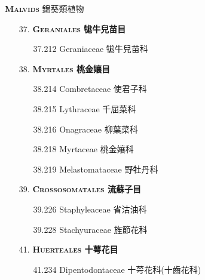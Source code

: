 \vspace{2ex} 
\noindent \normalsize\textsc{\textbf{Malvids} 錦葵類植物}\selectfont \\
\footnotesize\selectfont
\begin{enumerate}
  \item[37. ] \textbf{\textsc{Geraniales} 牻牛兒苗目}   
    \begin{enumerate}
      \item[37.212] Geraniaceae 牻牛兒苗科     
        
    \end{enumerate}
  \item[38. ] \textbf{\textsc{Myrtales} 桃金孃目}   
    \begin{enumerate}
      \item[38.214] Combretaceae 使君子科     
        
      \item[38.215] Lythraceae 千屈菜科     
        
      \item[38.216] Onagraceae 柳葉菜科     
        
      \item[38.218] Myrtaceae 桃金孃科     
        
      \item[38.219] Melastomataceae 野牡丹科     
        
    \end{enumerate}
  \item[39. ] \textbf{\textsc{Crossosomatales} 流蘇子目}   
    \begin{enumerate}
      \item[39.226] Staphyleaceae 省沽油科     
        
      \item[39.228] Stachyuraceae 旌節花科     
        
    \end{enumerate}
  \item[41. ] \textbf{\textsc{Huerteales} 十萼花目}   
    \begin{enumerate}
      \item[41.234] Dipentodontaceae 十萼花科(十齒花科)     

\end{enumerate}
\end{enumerate}
